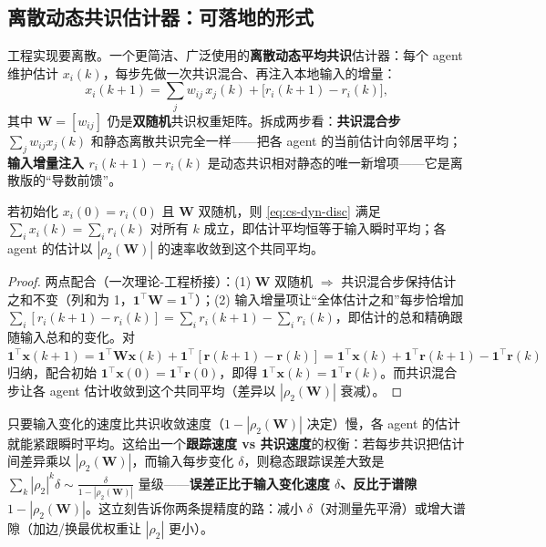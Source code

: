 \subsection{离散动态共识估计器：可落地的形式}
\label{sec:cs-dyn-disc}

工程实现要离散。一个更简洁、广泛使用的\textbf{离散动态平均共识}估计器：每个 agent 维护估计 $x_i(k)$，每步先做一次共识混合、再注入本地输入的增量：
\begin{equation}
  x_i(k{+}1)=\sum_j w_{ij}\,x_j(k)+\big[r_i(k{+}1)-r_i(k)\big],
  \label{eq:cs-dyn-disc}
\end{equation}
其中 $\mathbf{W}=[w_{ij}]$ 仍是\textbf{双随机}共识权重矩阵。拆成两步看：\textbf{共识混合步 $\sum_j w_{ij}x_j(k)$} 和静态离散共识完全一样——把各 agent 的当前估计向邻居平均；\textbf{输入增量注入 $r_i(k{+}1)-r_i(k)$} 是动态共识相对静态的唯一新增项——它是离散版的“导数前馈”。

\begin{theorem}[离散动态共识的无偏跟踪]\label{thm:cs-dyn-conserve}
若初始化 $x_i(0)=r_i(0)$ 且 $\mathbf{W}$ 双随机，则 \cref{eq:cs-dyn-disc} 满足 $\sum_i x_i(k)=\sum_i r_i(k)$ 对所有 $k$ 成立，即估计平均恒等于输入瞬时平均；各 agent 的估计以 $|\rho_2(\mathbf{W})|$ 的速率收敛到这个共同平均。
\end{theorem}

\begin{proof}
两点配合（一次理论-工程桥接）：(1) $\mathbf{W}$ 双随机 $\Rightarrow$ 共识混合步保持估计之和不变（列和为 1，$\mathbf{1}^\top\mathbf{W}=\mathbf{1}^\top$）；(2) 输入增量项让“全体估计之和”每步恰增加 $\sum_i[r_i(k{+}1)-r_i(k)]=\sum_i r_i(k{+}1)-\sum_i r_i(k)$，即估计的总和精确跟随输入总和的变化。对 $\mathbf{1}^\top\mathbf{x}(k{+}1)=\mathbf{1}^\top\mathbf{W}\mathbf{x}(k)+\mathbf{1}^\top[\mathbf{r}(k{+}1)-\mathbf{r}(k)]=\mathbf{1}^\top\mathbf{x}(k)+\mathbf{1}^\top\mathbf{r}(k{+}1)-\mathbf{1}^\top\mathbf{r}(k)$ 归纳，配合初始 $\mathbf{1}^\top\mathbf{x}(0)=\mathbf{1}^\top\mathbf{r}(0)$，即得 $\mathbf{1}^\top\mathbf{x}(k)=\mathbf{1}^\top\mathbf{r}(k)$。而共识混合步让各 agent 估计收敛到这个共同平均（差异以 $|\rho_2(\mathbf{W})|$ 衰减）。
\end{proof}

只要输入变化的速度比共识收敛速度（$1-|\rho_2(\mathbf{W})|$ 决定）慢，各 agent 的估计就能紧跟瞬时平均。这给出一个\textbf{跟踪速度 vs 共识速度}的权衡：若每步共识把估计间差异乘以 $|\rho_2(\mathbf{W})|$，而输入每步变化 $\delta$，则稳态跟踪误差大致是 $\sum_k|\rho_2|^k\delta\sim\tfrac{\delta}{1-|\rho_2(\mathbf{W})|}$ 量级——\textbf{误差正比于输入变化速度 $\delta$、反比于谱隙 $1-|\rho_2(\mathbf{W})|$}。这立刻告诉你两条提精度的路：减小 $\delta$（对测量先平滑）或增大谱隙（加边/换最优权重让 $|\rho_2|$ 更小）。

